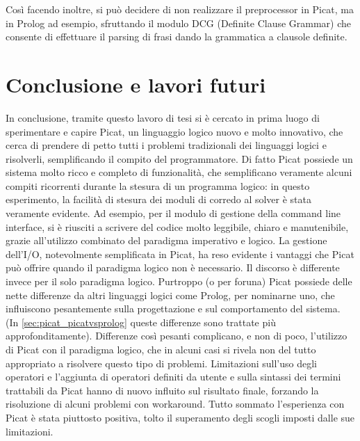 \documentclass[12pt,a4paper,openright]{book} %
\begin{document}
Così facendo inoltre, si può decidere di non realizzare il
preprocessor in Picat, ma in Prolog ad esempio, sfruttando il modulo
DCG \cite{MetalevelDCG} (Definite Clause Grammar) che consente di
effettuare il parsing di frasi dando la grammatica a clausole
definite.



\chapter{Conclusione e lavori futuri}
\label{ch:conclusion}

In conclusione, tramite questo lavoro di tesi si è cercato in prima
luogo di sperimentare e capire Picat, un linguaggio logico nuovo e
molto innovativo, che cerca di prendere di petto tutti i problemi
tradizionali dei linguaggi logici e risolverli, semplificando il
compito del programmatore. Di fatto Picat possiede un sistema molto
ricco e completo di funzionalità, che semplificano veramente alcuni
compiti ricorrenti durante la stesura di un programma logico: in
questo esperimento, la facilità di stesura dei moduli di corredo al
solver è stata veramente evidente. Ad esempio, per il modulo di
gestione della command line interface, si è riusciti a scrivere del
codice molto leggibile, chiaro e manutenibile, grazie all'utilizzo
combinato del paradigma imperativo e logico. La gestione dell'I/O,
notevolmente semplificata in Picat, ha reso evidente i vantaggi che
Picat può offrire quando il paradigma logico non è necessario. Il
discorso è differente invece per il solo paradigma logico. Purtroppo
(o per foruna) Picat possiede delle nette differenze da altri
linguaggi logici come Prolog, per nominarne uno, che influiscono
pesantemente sulla progettazione e sul comportamento del sistema. (In
\ref{sec:picat_picatvsprolog} queste differenze sono trattate più
approfonditamente). Differenze così pesanti complicano, e non di poco,
l'utilizzo di Picat con il paradigma logico, che in alcuni casi si
rivela non del tutto appropriato a risolvere questo tipo di
problemi. Limitazioni sull'uso degli operatori e l'aggiunta di
operatori definiti da utente e sulla sintassi dei termini trattabili
da Picat hanno di nuovo influito sul risultato finale, forzando la
risoluzione di alcuni problemi con workaround. Tutto sommato
l'esperienza con Picat è stata piuttosto positiva, tolto il
superamento degli scogli imposti dalle sue limitazioni.
\end{document}
